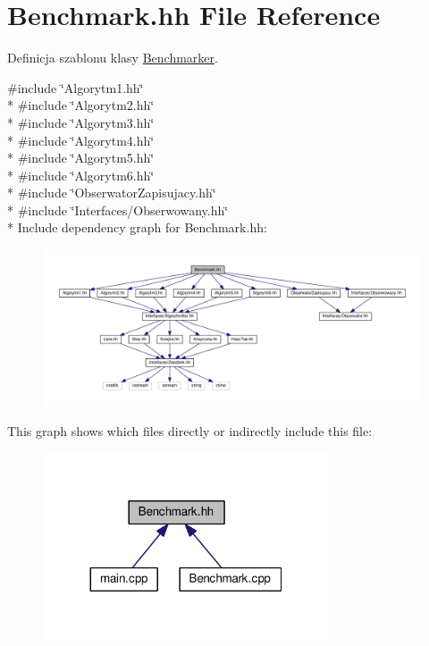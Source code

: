 \hypertarget{a00034}{}\section{Benchmark.\+hh File Reference}
\label{a00034}


Definicja szablonu klasy \hyperlink{a00009}{Benchmarker}.  


{\ttfamily \#include \char`\"{}Algorytm1.\+hh\char`\"{}}\\*
{\ttfamily \#include \char`\"{}Algorytm2.\+hh\char`\"{}}\\*
{\ttfamily \#include \char`\"{}Algorytm3.\+hh\char`\"{}}\\*
{\ttfamily \#include \char`\"{}Algorytm4.\+hh\char`\"{}}\\*
{\ttfamily \#include \char`\"{}Algorytm5.\+hh\char`\"{}}\\*
{\ttfamily \#include \char`\"{}Algorytm6.\+hh\char`\"{}}\\*
{\ttfamily \#include \char`\"{}Obserwator\+Zapisujacy.\+hh\char`\"{}}\\*
{\ttfamily \#include \char`\"{}Interfaces/\+Obserwowany.\+hh\char`\"{}}\\*
Include dependency graph for Benchmark.\+hh\+:
\nopagebreak
\begin{figure}[H]
\begin{center}
\leavevmode
\includegraphics[width=350pt]{a00077}
\end{center}
\end{figure}
This graph shows which files directly or indirectly include this file\+:
\nopagebreak
\begin{figure}[H]
\begin{center}
\leavevmode
\includegraphics[width=239pt]{a00078}
\end{center}
\end{figure}
